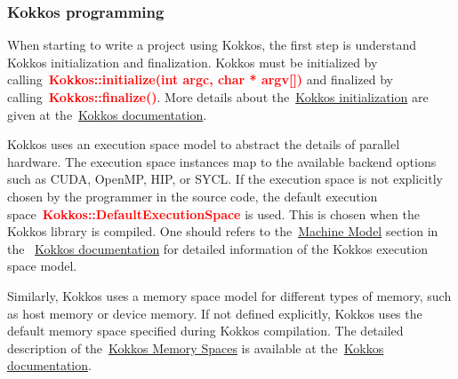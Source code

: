 





\subsubsection{Kokkos programming}


\par
When starting to write a project using Kokkos, the first step is understand Kokkos initialization and finalization.
Kokkos must be initialized by calling~\textbf{\textcolor{red}{Kokkos::initialize(int argc, char * argv[])}} and finalized by calling~\textbf{\textcolor{red}{Kokkos::finalize()}}.
More details about the~\href{https://kokkos.github.io/kokkos-core-wiki/ProgrammingGuide/Initialization.html}{Kokkos initialization} are given at the~\href{https://kokkos.github.io/kokkos-core-wiki/index.html}{Kokkos documentation}.


\par
Kokkos uses an execution space model to abstract the details of parallel hardware.
The execution space instances map to the available backend options such as CUDA, OpenMP, HIP, or SYCL.
If the execution space is not explicitly chosen by the programmer in the source code, the default execution space~\textbf{\textcolor{red}{Kokkos::DefaultExecutionSpace}} is used. 
This is chosen when the Kokkos library is compiled.
One should refers to the~\href{https://kokkos.github.io/kokkos-core-wiki/ProgrammingGuide/Machine-Model.html#}{Machine Model} section in the ~\href{https://kokkos.github.io/kokkos-core-wiki/index.html}{Kokkos documentation} for detailed information of the Kokkos execution space model.


\par
Similarly, Kokkos uses a memory space model for different types of memory, such as host memory or device memory.
If not defined explicitly, Kokkos uses the default memory space specified during Kokkos compilation.
The detailed description of the~\href{https://kokkos.github.io/kokkos-core-wiki/ProgrammingGuide/Machine-Model.html#kokkos-memory-spaces}{Kokkos Memory Spaces} is available at the~\href{https://kokkos.github.io/kokkos-core-wiki/index.html}{Kokkos documentation}.


